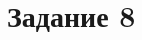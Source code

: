 \section*{Задание 8}                                                                                                                                                                                                                                                                                                                                                                                                                                                                                                                                                                                                                                                                                                                                                                                                                                                                                                                                                                                                                                                                                                                                                                                                                                                                                                                                                                                                                                                                                                                                                                                                                                                                                                                                                                                                                                                                                                                                                                                                                                                                                                                                                                                                                                                                                                                                                                                                                                                                                                                                                                                                                                                                                                                                                                                                                                                                                                                                                                                                                                                                                                                                                                                                                                    